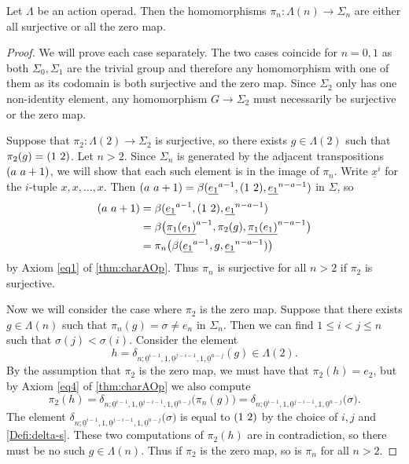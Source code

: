 \begin{prop}\label{prop:surjortriv} Let $\Lambda$ be an action operad. Then the homomorphisms $\pi_n \colon \Lambda(n) \rightarrow \Sigma_n$ are either all surjective or all the zero map.
\end{prop}
\begin{proof}
We will prove each case separately. The two cases coincide for $n = 0, 1$ as both $\Sigma_0, \Sigma_1$ are the trivial group and therefore any homomorphism with one of them as its codomain is both surjective and the zero map. Since $\Sigma_2$ only has one non-identity element, any homomorphism $G \rightarrow \Sigma_2$ must necessarily be surjective or the zero map.

Suppose that $\pi_2 \colon \Lambda(2) \rightarrow \Sigma_2$ is surjective, so there exists $g \in \Lambda(2)$ such that $\pi_2(g) = ( 1 \, \, 2 )$. Let $n>2$. Since $\Sigma_n$ is generated by the adjacent transpositions $( a \, \, a+1 )$, we will show that each such element is in the image of $\pi_n$. Write $\underline{x}^i$ for the $i$-tuple $x, x, \ldots, x$. Then $( a \, \, a+1 ) = \beta(\underline{e_1}^{a-1} ,( 1 \, \, 2 ),\underline{e_1}^{n-a-1})$ in $\Sigma$, so
  \begin{align*}
      ( a \, \, a+1 ) &= \beta(\underline{e_1}^{a-1},( 1 \, \, 2 ),\underline{e_1}^{n-a-1}) \\ &= \beta\big(\underline{\pi_1(e_1)}^{a-1},\pi_2(g),\underline{\pi_1(e_1)}^{n-a-1}\big) \\
      &= \pi_n\big(\beta(\underline{e_1}^{a-1},g,\underline{e_1}^{n-a-1})\big)
  \end{align*}
by Axiom \eqref{eq1} of \ref{thm:charAOp}.
Thus $\pi_n$ is surjective for all $n>2$ if $\pi_2$ is surjective.

Now we will consider the case where $\pi_2$ is the zero map.
Suppose that there exists $g \in \Lambda(n)$ such that $\pi_n(g) = \sigma \neq e_n$ in $\Sigma_n$.
Then we can find $1 \leq i < j \leq n$ such that $\sigma(j) < \sigma(i)$.
Consider the element 
\[
h = \delta_{n; \underline{0}^{i-1}, 1, \underline{0}^{j-i-1}, 1, \underline{0}^{n-j}}(g) \in \Lambda(2).
\]
By the assumption that $\pi_2$ is the zero map, we must have that $\pi_2(h) = e_2$, but by Axiom \eqref{eq4} of \ref{thm:charAOp} we also compute
\[
\pi_2(h) = \delta_{n; \underline{0}^{i-1}, 1, \underline{0}^{j-i-1}, 1, \underline{0}^{n-j}}\big( \pi_n(g) \big) =  \delta_{n; \underline{0}^{i-1}, 1, \underline{0}^{j-i-1}, 1, \underline{0}^{n-j}}\big( \sigma \big).
\]
The element $\delta_{n; \underline{0}^{i-1}, 1, \underline{0}^{j-i-1}, 1, \underline{0}^{n-j}}\big( \sigma \big)$ is equal to $( 1 \, \, 2 )$ by the choice of $i, j$ and \cref{Defi:delta-s}.
These two computations of $\pi_2(h)$ are in contradiction, so there must be no such $g \in \Lambda(n)$.
Thus if $\pi_2$ is the zero map, so is $\pi_n$ for all $n>2$.
\end{proof}



